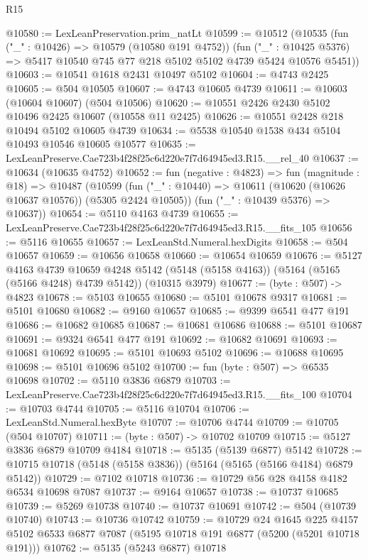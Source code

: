 \begin{lexlean}{R15}
\begin{coremodule}
{{{{{{{{{{{@10580 := LexLeanPreservation.prim_natLt
@10599 := @10512
    (@10535
      (fun ("_" : @10426) => @10579 (@10580 @191 @4752))
      (fun ("_" : @10425 @5376) => @5417 @10540 @745 @77 @218 @5102 @5102 @4739 @5424 @10576 @5451))
@10603 := @10541 @1618 @2431 @10497 @5102
@10604 := @4743 @2425
@10605 := @504 @10505
@10607 := @4743 @10605 @4739
@10611 := @10603 (@10604 @10607) (@504 @10506)
@10620 := @10551 @2426 @2430 @5102 @10496 @2425 @10607 (@10558 @11 @2425)
@10626 := @10551 @2428 @218 @10494 @5102 @10605 @4739
@10634 := @5538 @10540 @1538 @434 @5104 @10493 @10546 @10605 @10577
@10635 := LexLeanPreserve.Cae723b4f28f25c6d220e7f7d64945ed3.R15.__rel_40
@10637 := @10634 (@10635 @4752)
@10652 := fun (negative : @4823) =>
  fun (magnitude : @18) =>
  @10487
    (@10599
      (fun ("_" : @10440) => @10611 (@10620 (@10626 @10637 @10576)) (@5305 @2424 @10505))
      (fun ("_" : @10439 @5376) => @10637))
@10654 := @5110 @4163 @4739
@10655 := LexLeanPreserve.Cae723b4f28f25c6d220e7f7d64945ed3.R15.__fits_105
@10656 := @5116 @10655
@10657 := LexLeanStd.Numeral.hexDigits
@10658 := @504 @10657
@10659 := @10656 @10658
@10660 := @10654 @10659
@10676 := @5127
    @4163
    @4739
    @10659
    @4248
    @5142
    (@5148 (@5158 @4163))
    (@5164 (@5165 (@5166 @4248) @4739 @5142))
    (@10315 @3979)
@10677 := (byte : @507) -> @4823
@10678 := @5103 @10655
@10680 := @5101 @10678 @9317
@10681 := @5101 @10680
@10682 := @9160 @10657
@10685 := @9399 @6541 @477 @191
@10686 := @10682 @10685
@10687 := @10681 @10686
@10688 := @5101 @10687
@10691 := @9324 @6541 @477 @191
@10692 := @10682 @10691
@10693 := @10681 @10692
@10695 := @5101 @10693 @5102
@10696 := @10688 @10695
@10698 := @5101 @10696 @5102
@10700 := fun (byte : @507) => @6535 @10698
@10702 := @5110 @3836 @6879
@10703 := LexLeanPreserve.Cae723b4f28f25c6d220e7f7d64945ed3.R15.__fits_100
@10704 := @10703 @4744
@10705 := @5116 @10704
@10706 := LexLeanStd.Numeral.hexByte
@10707 := @10706 @4744
@10709 := @10705 (@504 @10707)
@10711 := (byte : @507) -> @10702 @10709
@10715 := @5127 @3836 @6879 @10709 @4184
@10718 := @5135 (@5139 @6877) @5142
@10728 := @10715 @10718 (@5148 (@5158 @3836)) (@5164 (@5165 (@5166 @4184) @6879 @5142))
@10729 := @7102 @10718
@10736 := @10729 @56 @28 @4158 @4182 @6534 @10698 @7087
@10737 := @9164 @10657
@10738 := @10737 @10685
@10739 := @5269 @10738
@10740 := @10737 @10691
@10742 := @504 (@10739 @10740)
@10743 := @10736 @10742
@10759 := @10729
    @24
    @1645
    @225
    @4157
    @5102
    @6533
    @6877
    @7087
    (@5195 @10718 @191 @6877 (@5200 (@5201 @10718 @191)))
@10762 := @5135 (@5243 @6877) @10718
}}}}}}}}}}}
\end{coremodule}
\end{lexlean}
